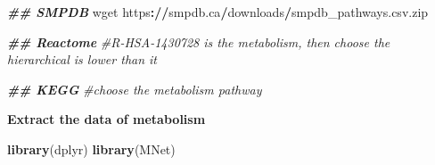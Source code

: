 \documentclass[
]{book}
\newenvironment{Shaded}{\begin{snugshade}}{\end{snugshade}}
\newcommand{\CommentTok}[1]{\textcolor[rgb]{0.56,0.35,0.01}{\textit{#1}}}
\newcommand{\DocumentationTok}[1]{\textcolor[rgb]{0.56,0.35,0.01}{\textbf{\textit{#1}}}}
\newcommand{\ErrorTok}[1]{\textcolor[rgb]{0.64,0.00,0.00}{\textbf{#1}}}
\newcommand{\FunctionTok}[1]{\textcolor[rgb]{0.13,0.29,0.53}{\textbf{#1}}}
\newcommand{\NormalTok}[1]{#1}
\newcommand{\SpecialCharTok}[1]{\textcolor[rgb]{0.81,0.36,0.00}{\textbf{#1}}}
\begin{document}
\begin{Shaded}
\begin{Highlighting}[]
\DocumentationTok{\#\# SMPDB}
\NormalTok{wget https}\SpecialCharTok{:}\ErrorTok{//}\NormalTok{smpdb.ca}\SpecialCharTok{/}\NormalTok{downloads}\SpecialCharTok{/}\NormalTok{smpdb\_pathways.csv.zip}

\DocumentationTok{\#\# Reactome}
\CommentTok{\#R{-}HSA{-}1430728 is the metabolism, then choose the hierarchical is lower than it}

\DocumentationTok{\#\# KEGG}
\CommentTok{\#choose the metabolism pathway}
\end{Highlighting}
\end{Shaded}

\textbf{Extract the data of metabolism}

\begin{Shaded}
\begin{Highlighting}[]
\FunctionTok{library}\NormalTok{(dplyr)}
\FunctionTok{library}\NormalTok{(MNet)}


\end{Highlighting}
\end{Shaded}
\end{document}
